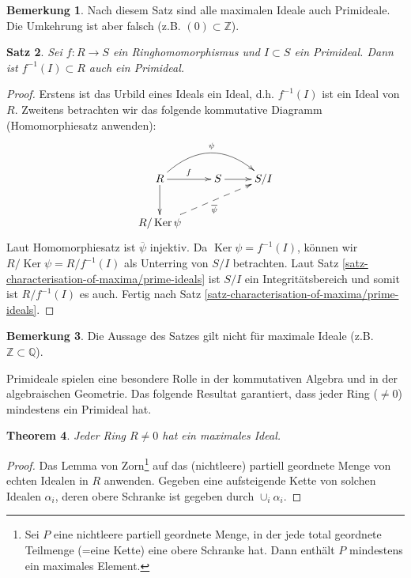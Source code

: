 \documentclass[reqno,12pt]{article}
\numberwithin{equation}{section}
\newcommand{\bQ}{\mathbb{Q}}
\newcommand{\bZ}{\mathbb{Z}}
\newcommand{\ol}{\overline}
\newcommand{\Ker}{\text{Ker }}
\theoremstyle{plain}
\newtheorem{thm}{Theorem}[section]
\newtheorem{proposition}[thm]{Satz}
\theoremstyle{definition}
\newtheorem{remark}[thm]{Bemerkung}
\renewcommand{\Ker}{\operatorname{Ker}}
\begin{document}
\begin{remark}
Nach diesem Satz sind alle maximalen Ideale auch Primideale. Die Umkehrung ist aber falsch (z.B. $(0) \subset \bZ$).
\end{remark}

\begin{proposition}\label{satz-preimages-of-prime-ideals}
Sei $f \colon R \to S$ ein Ringhomomorphismus und $I \subset S$ ein Primideal. Dann ist $f^{-1}(I) \subset R$ auch ein Primideal.
\end{proposition}

\begin{proof}
Erstens ist das Urbild eines Ideals ein Ideal, d.h. $f^{-1}(I)$ ist ein Ideal von $R$. Zweitens betrachten wir das folgende kommutative Diagramm (Homomorphiesatz anwenden):
\begin{align*}
  \xymatrix{
  R \ar[r]^f  \ar@/^2pc/[rr]^{\psi} \ar[d] & S \ar[r] & S/I \\
  R/\Ker \psi \ar@{-->}[urr]_{\ol{\psi}}
  }
\end{align*}
Laut Homomorphiesatz ist $\ol{\psi}$ injektiv. Da $\Ker \psi = f^{-1}(I)$, können wir $R/\Ker \psi = R/f^{-1}(I)$ als Unterring von $S/I$ betrachten. Laut Satz \ref{satz-characterisation-of-maxima/prime-ideals} ist $S/I$ ein Integritätsbereich und somit ist $R/f^{-1}(I)$ es auch. Fertig nach Satz \ref{satz-characterisation-of-maxima/prime-ideals}.
\end{proof}

\begin{remark}
Die Aussage des Satzes gilt nicht für maximale Ideale (z.B. $\bZ \subset \bQ$).
\end{remark}

Primideale spielen eine besondere Rolle in der kommutativen Algebra und in der algebraischen Geometrie. Das folgende Resultat garantiert, dass jeder Ring ($\neq 0$) mindestens ein Primideal hat.

\begin{thm}\label{theorem-maximal-ideals-exist}
Jeder Ring $R \neq 0$ hat ein maximales Ideal.
\end{thm}

\begin{proof}
Das Lemma von Zorn\footnote{Sei $P$ eine nichtleere partiell geordnete Menge, in der jede total geordnete Teilmenge (=eine Kette) eine obere Schranke hat. Dann enthält $P$ mindestens ein maximales Element.} auf das (nichtleere) partiell geordnete Menge von echten Idealen in $R$ anwenden. Gegeben eine aufsteigende Kette von solchen Idealen $\alpha_i$, deren obere Schranke ist gegeben durch $\cup_i \alpha_i$.
\end{proof}
\end{document}
